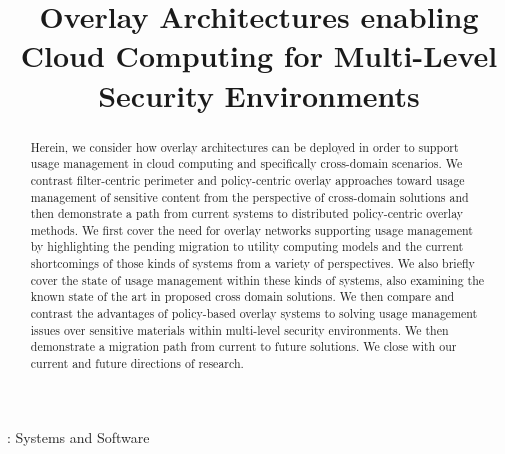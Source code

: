 \documentclass{sig-alternate}
\begin{document}
\title{Overlay Architectures enabling Cloud Computing for Multi-Level Security Environments}


\maketitle

\begin{abstract}
Herein,  we consider how overlay architectures can be deployed in order to support usage management in cloud computing and specifically cross-domain scenarios.  We contrast filter-centric perimeter and policy-centric overlay approaches toward usage management of sensitive content from the perspective of cross-domain solutions and then demonstrate a path from current systems to distributed policy-centric overlay methods.  We first cover the need for overlay networks supporting usage management by highlighting the pending migration to utility computing models and the current shortcomings of those kinds of systems from a variety of perspectives.  We also briefly cover the state of usage management within these kinds of systems, also examining the known state of the art in proposed cross domain solutions.  We then compare and contrast the advantages of policy-based overlay systems to solving usage management issues over sensitive materials within multi-level security environments. We then demonstrate a migration path from current to future solutions.  We close with our current and future directions of research. 
\end{abstract}

 : {Systems and Software}


\end{document}
